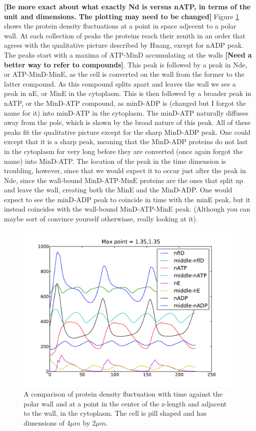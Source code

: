 \documentclass[letterpaper,twocolumn,amsmath,amssymb,pre]{revtex4-1}
\newcommand{\red}[1]{{\bf \color{red} #1}}
\newcommand{\fixme}[1]{\red{[#1]}}
\begin{document}
\fixme{Be more exact about what exactly Nd is versus nATP, in terms of
  the unit and dimensions.  The plotting may need to be changed}
Figure \ref{frequency-plot-40-20-0-0-150} shows the protein density
fluctuations at a point in space adjecent to a polar wall.  At each
collection of peaks the proteins reach their zenith in an order that
agrees with the qualitative picture described by
Huang\cite{huang2003dynamic}, except for nADP peak.  The peaks start
with a maxima of ATP-MinD accumulating at the walls \fixme{Need a
  better way to refer to compounds}. This peak is followed by a peak
in Nde, or ATP-MinD-MinE, as the cell is converted on the wall from
the former to the latter compound.  As this compound splits apart and
leaves the wall we see a peak in nE, or MinE in the cytoplasm.  This
is then followed by a broader peak in nATP, or the MinD-ATP compound,
as minD-ADP is (changed but I forgot the name for it) into minD-ATP in
the cytoplasm.  The minD-ATP naturally diffuses away from the pole,
which is shown by the broad nature of this peak.  All of these peaks
fit the qualitative picture except for the sharp MinD-ADP peak.  One
could except that it is a sharp peak, meaning that the MinD-ADP proteins
do not last in the cytoplasm for very long before they are converted
(once again forgot the name) into MinD-ATP.  The location of the peak
in the time dimension is troubling, however, since that we would
expect it to occur just after the peak in Nde, since the wall-bound
MinD-ATP-MinE proteins are the ones that split up and leave the wall,
creating both the MinE and the MinD-ADP.  One would expect to see the
minD-ADP peak to coincide in time with the minE peak, but it instead
coincides with the wall-bound MinD-ATP-MinE peak. (Although you can
maybe sort of convince yourself otherwiase, really looking at it).

\begin{figure}
  \includegraphics[width=\columnwidth]{../data/shape-p/plots/frequency_plot_all_middle-p-40-20-0-0-150.pdf}
  \caption{A comparison of protein density fluctuation with time
    against the polar wall and at a point in the center of the
    z-length and adjacent to the wall, in the cytoplasm.  The cell is
    pill shaped and has dimensions of 4$\mu m$ by 2$\mu m$.  }
  \label{frequency-plot-40-20-0-0-150}
\end{figure}
\end{document}
